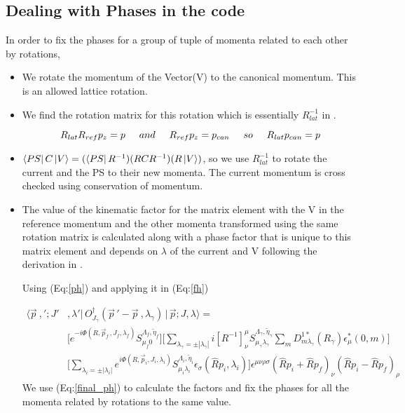 \documentclass[10pt]{article}
\begin{document}
\subsection{Dealing with Phases in the code}
In order to fix the phases for a group of tuple of momenta related to each other by rotations,
\begin{itemize}
 	\item We rotate the momentum of the Vector(V) to the canonical momentum. This is an allowed lattice rotation.
	\item We find the rotation matrix for this rotation which is essentially $R_{lat}^{-1}$ in \cite{hel}.

\begin{equation}
R_{lat}R_{ref}p_z = p \hspace{5mm}and\hspace{5mm} R_{ref}p_z = p_{can} \hspace{5mm}so\hspace{5mm} R_{lat}p_{can} = p
\label{rot_mat}
\end{equation}
	
	\item $\bra{PS}C\ket{V} = (\bra{PS}R^{-1})(RCR^{-1})(R\ket{V}) $, so we use $R_{lat}^{-1}$ to rotate the current and the PS to their new momenta. The current momentum is cross checked using conservation of momentum.
	\item The value of the kinematic factor for the matrix element with the V in the reference momentum and the other momenta transformed using the same rotation matrix is calculated along with a phase factor that is unique to this matrix element and depends on $\lambda$ of the current and V following the derivation in \cite{shultz}. \par
	Using (Eq:\ref{ph}) and applying it in  (Eq:\ref{fh})

\begin{align}
\big\langle \vec{p}\ ,'; J'& ,\lambda'  \big| \, O_{J_\gamma}^{\dagger}(\vec{p}\,' - \vec{p}\ ,\lambda_{\gamma}) \, \big| \, \vec{p}; J, \lambda  \big\rangle = \\
&\Big[ e^{-i \Phi(R, \vec{p}_f\,, J_f, \lambda_f)} S^{ \Lambda_f,\tilde{\eta}_f  }_{\mu_f 0} \Big] 
\Big[ \sum_{\lambda_{\gamma} = \pm|\lambda_{\gamma}|} i \left[R^{-1}\right]^\mu_\nu S^{ \Lambda_{\gamma},\tilde{\eta}_{\gamma}  }_{\mu_{\gamma} \lambda_{\gamma} }\sum_{m}D^{1*}_{m\lambda_{\gamma}}(R_\gamma)\epsilon^{*}_{\mu}(0, m)\Big ] \\
&\Big[  \sum_{\lambda_i = \pm|\lambda_i| } e^{i \Phi(R, \vec{p}_i, J_i, \lambda_i)} S^{ \Lambda_i,\tilde{\eta}_i  }_{\mu_i\lambda_i} \epsilon_{\sigma}(\hat{R}p_i, \lambda_i) \Big]  \epsilon^{\mu\nu\rho\sigma}(\hat{R}p_i + \hat{R}p_f)_{\nu}(\hat{R}p_i - \hat{R}p_f)_{\rho}
\label{final_ph}
\end{align}
We use (Eq:\ref{final_ph}) to calculate the factors and fix the phases for all the momenta related by rotations to the same value.	
\end{itemize}
\end{document}
